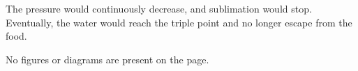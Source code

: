 The pressure would continuously decrease, and sublimation would stop. Eventually, the water would reach the triple point and no longer escape from the food.  

No figures or diagrams are present on the page.